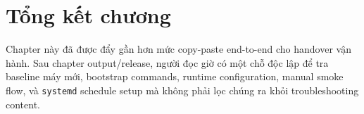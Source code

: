 \section{Tổng kết chương}

Chapter này đã được đẩy gần hơn mức copy-paste end-to-end cho handover vận hành. Sau chapter output/release, người đọc giờ có một chỗ độc lập để tra baseline máy mới, bootstrap commands, runtime configuration, manual smoke flow, và \texttt{systemd} schedule setup mà không phải lọc chúng ra khỏi troubleshooting content.
